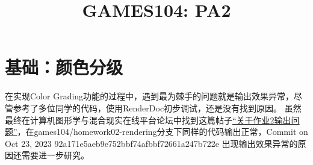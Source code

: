 \documentclass{ctexart}
\title{GAMES104: PA2}
\begin{document}
    
    \maketitle
    
    \section{基础：颜色分级} \label{section:basic1}
    在实现Color Grading功能的过程中，遇到最为棘手的问题就是输出效果异常，尽管参考了多位同学的代码，使用RenderDoc初步调试，还是没有找到原因。
    虽然最终在计算机图形学与混合现实在线平台论坛中找到这篇帖子\href{https://games-cn.org/forums/topic/guanyuzuoye2shuchuwenti/}{“关于作业2输出问题”}，在games104/homework02-rendering分支下同样的代码输出正常，Commit on Oct 23, 2023 92a171e5aeb9e752bbf74afbbf72661a247b722e 出现输出效果异常的原因还需要进一步研究。
    
\end{document}
